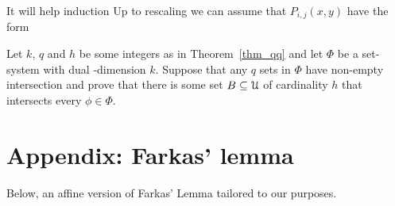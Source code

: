 \documentclass[combinatorics.tex]{subfiles}
\begin{document}
% 
It will help induction 
% 
% 
Up to rescaling we can assume that $P_{i,j}(x,y)$ have the form 
% 
% 
% 
% 
% 
% 

\begin{exercise}\label{ex_dual_qqthm}
Let $k$, $q$ and $h$ be some integers as in Theorem~\ref{thm_qq} and let $\Phi$ be a set-system with dual \vc-dimension $k$.
Suppose that any $q$ sets in $\Phi$ have non-empty intersection and prove that there is some set $B\subseteq\EuScript U$ of cardinality $h$ that intersects every $\phi\in\Phi$.\QED
\end{exercise}




\section{Appendix: Farkas' lemma}\label{appendix}

Below, an affine version of Farkas' Lemma tailored to our purposes.
\end{document}
